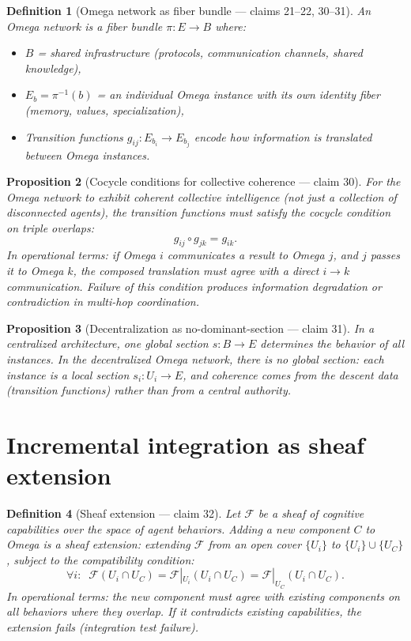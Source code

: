 \documentclass[11pt,a4paper]{article}
\newtheorem{definition}{Definition}[section]
\newtheorem{proposition}[definition]{Proposition}
\begin{document}
\begin{definition}[Omega network as fiber bundle --- claims 21--22, 30--31]
\label{def:omega-network}
An \emph{Omega network} is a fiber bundle $\pi : E \to B$ where:
\begin{itemize}
\item $B$ = shared infrastructure (protocols, communication channels,
  shared knowledge),
\item $E_b = \pi^{-1}(b)$ = an individual Omega instance with its own
  identity fiber (memory, values, specialization),
\item Transition functions $g_{ij} : E_{b_i} \to E_{b_j}$ encode
  how information is translated between Omega instances.
\end{itemize}
\end{definition}

\begin{proposition}[Cocycle conditions for collective coherence --- claim 30]
\label{prop:cocycle}
For the Omega network to exhibit coherent collective intelligence
(not just a collection of disconnected agents), the transition functions
must satisfy the cocycle condition on triple overlaps:
\[
  g_{ij} \circ g_{jk} = g_{ik}.
\]
In operational terms: if Omega $i$ communicates a result to Omega $j$,
and $j$ passes it to Omega $k$, the composed translation must agree
with a direct $i \to k$ communication. Failure of this condition produces
information degradation or contradiction in multi-hop coordination.
\end{proposition}

\begin{proposition}[Decentralization as no-dominant-section --- claim 31]
\label{prop:decentral}
In a centralized architecture, one global section $s : B \to E$ determines
the behavior of all instances. In the decentralized Omega network, there
is no global section: each instance is a local section $s_i : U_i \to E$,
and coherence comes from the descent data (transition functions) rather
than from a central authority.
\end{proposition}

\section{Incremental integration as sheaf extension}
\label{sec:sheaf}

\begin{definition}[Sheaf extension --- claim 32]
\label{def:sheaf-ext}
Let $\mathcal{F}$ be a sheaf of cognitive capabilities over the space
of agent behaviors. Adding a new component $C$ to Omega is a
\emph{sheaf extension}: extending $\mathcal{F}$ from an open cover
$\{U_i\}$ to $\{U_i\} \cup \{U_C\}$, subject to the compatibility
condition:
\[
  \forall i: \;\; \mathcal{F}(U_i \cap U_C) =
  \mathcal{F}|_{U_i}(U_i \cap U_C) = \mathcal{F}|_{U_C}(U_i \cap U_C).
\]
In operational terms: the new component must agree with existing
components on all behaviors where they overlap. If it contradicts
existing capabilities, the extension fails (integration test failure).
\end{definition}
\end{document}
